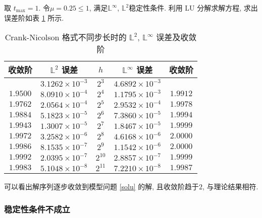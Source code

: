 \documentclass[UTF8, a4paper, 12pt, oneside, onecolumn]{article}
\begin{document}
取 $t_{\max} =1$. 令$\mu = 0.25 \leq 1$, 满足$\mathbb{L}^{\infty}$, $\mathbb{L}^2$稳定性条件. 利用 LU 分解求解方程, 求出误差阶如表 \ref{tab:cnerr1} 所示.
\begin{table}[H]\centering\heiti{}
	\caption{Crank-Nicolson 格式不同步长时的 $\mathbb{L}^2$, $\mathbb{L}^\infty$ 误差及收敛阶}\label{tab:cnerr1}
	\begin{tabular}{|c|c|c|c|c|}\hline
		收敛阶	&	$\mathbb{L}^2$ 误差	&	$h$	&	$\mathbb{L}^\infty$ 误差		&	收敛阶\\\hline
		&	$3.1262 \times 10^{-3}$	&	$2^3$		&	$4.6892 \times 10^{-3}$	&	\\\hline
		$1.9500$	&	$8.0910 \times 10^{-4}$	&	$2^4$		&	$1.1795 \times 10^{-3}$	&	$1.9912$\\\hline
		$1.9762$	&	$2.0564 \times 10^{-4}$	&	$2^5$		&	$2.9532 \times 10^{-4}$	&	$1.9978$\\\hline
		$1.9884$	&	$5.1823 \times 10^{-5}$	&	$2^6$		&	$7.3860 \times 10^{-5}$	&	$1.9994$\\\hline
		$1.9943$	&	$1.3007 \times 10^{-5}$	&	$2^7$		&	$1.8467 \times 10^{-5}$	&	$1.9999$\\\hline
		$1.9972$	&	$3.2582 \times 10^{-6}$	&	$2^8$		&	$4.6168 \times 10^{-6}$	&	$2.0000$\\\hline
		$1.9986$	&	$8.1535 \times 10^{-7}$	&	$2^9$		&	$1.1542 \times 10^{-6}$	&	$2.0000$\\\hline
		$1.9992$	&	$2.0395 \times 10^{-7}$	&	$2^{10}$	&	$2.8857 \times 10^{-7}$	&	$1.9999$\\\hline
		$1.9983$	&	$5.1048 \times 10^{-8}$	&	$2^{11}$	&	$7.2210 \times 10^{-8}$	&	$1.9987$\\\hline
	\end{tabular}
\end{table}
可以看出解序列逐步收敛到模型问题 \eqref{solu} 的解, 且收敛阶趋于$2$, 与理论结果相符.

\subsubsection{稳定性条件不成立}
\end{document}
